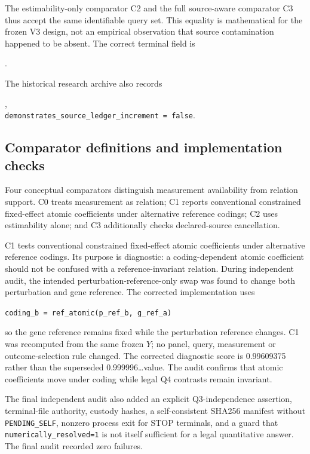 \documentclass[11pt]{article}
\begin{document}
The estimability-only comparator C2 and the full source-aware comparator C3 thus accept the same identifiable query set. This equality is mathematical for the frozen V3 design, not an empirical observation that source contamination happened to be absent. The correct terminal field is
\begin{center}
\texttt{}.
\end{center}
The historical research archive also records
\begin{center}
\texttt{},\\
\texttt{demonstrates\_source\_ledger\_increment = false}.
\end{center}


\subsection{Comparator definitions and implementation checks}
Four conceptual comparators distinguish measurement availability from relation support. C0 treats measurement as relation; C1 reports conventional constrained fixed-effect atomic coefficients under alternative reference codings; C2 uses estimability alone; and C3 additionally checks declared-source cancellation.

C1 tests conventional constrained fixed-effect atomic coefficients under alternative reference codings. Its purpose is diagnostic: a coding-dependent atomic coefficient should not be confused with a reference-invariant relation. During independent audit, the intended perturbation-reference-only swap was found to change both perturbation and gene reference. The corrected implementation uses
\begin{center}
\texttt{coding\_b = ref\_atomic(p\_ref\_b, g\_ref\_a)}
\end{center}
so the gene reference remains fixed while the perturbation reference changes. C1 was recomputed from the same frozen $Y$; no panel, query, measurement or outcome-selection rule changed. The corrected diagnostic score is 0.99609375 rather than the superseded 0.999996\ldots value. The audit confirms that atomic coefficients move under coding while legal Q4 contrasts remain invariant.

The final independent audit also added an explicit Q3-independence assertion, terminal-file authority, custody hashes, a self-consistent SHA256 manifest without \texttt{PENDING\_SELF}, nonzero process exit for STOP terminals, and a guard that \texttt{numerically\_resolved=1} is not itself sufficient for a legal quantitative answer. The final audit recorded zero failures.
\end{document}
